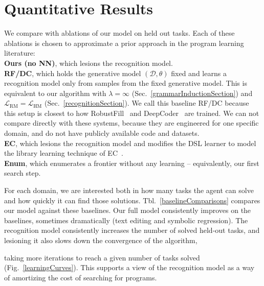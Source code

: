 \documentclass{article}
\newcommand{\probability}{\mathds{P}} %
\begin{document}
\section{Quantitative Results}\label{quantitative}

We compare with ablations of our model on held out tasks.
Each of these ablations is chosen to approximate
a prior approach in the program learning literature:
\\\noindent \textbf{Ours (no NN)}, which lesions the recognition model.
\\\noindent \textbf{RF/DC}, which holds the generative model $(\mathcal{D},\theta)$ fixed and learns
a recognition model only from samples from the fixed generative model.
This is equivalent to our algorithm with $\lambda = \infty$ (Sec.~\ref{grammarInductionSection})
and $\mathcal{L}_{\text{RM}} = \mathcal{L}_{\text{HM}}$ (Sec.~\ref{recognitionSection}).
We call this baseline RF/DC because
this setup is closest to how RobustFill~\cite{devlin2017robustfill} and DeepCoder~\cite{balog2016deepcoder} are trained.
We can not compare directly with these systems,
because they are engineered for one specific domain, and 
do not have publicly available code and datasets.
\\\noindent \textbf{EC}, which lesions the recognition model and modifies  the DSL learner to model the library learning technique of  EC~\cite{Dechter:2013:BLV:2540128.2540316}.
\\\noindent \textbf{Enum}, which enumerates a frontier without any learning -- equivalently, our first search step.

For each domain,
we are interested both in how many tasks the
agent can solve and how quickly it can find those solutions.
Tbl.~\ref{baselineComparisons}
compares our model against these baselines.
Our full model consistently
improves on the baselines,
sometimes dramatically (text editing and symbolic regression).
The recognition model 
consistently increases the number of solved held-out tasks,
and lesioning it also slows down the convergence of the algorithm,

taking more iterations to reach a given number of tasks solved (Fig.~\ref{learningCurves}).
This supports a view of the recognition model as a way of amortizing the cost of searching for programs.
\end{document}
